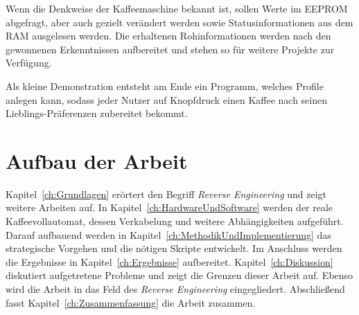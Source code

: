 Wenn die Denkweise der Kaffeemaschine bekannt ist, sollen Werte im \ac{EEPROM} abgefragt, aber auch gezielt verändert werden sowie Statusinformationen aus dem \ac{RAM} ausgelesen werden.
Die erhaltenen Rohinformationen werden nach den gewonnenen Erkenntnissen aufbereitet und stehen so für weitere Projekte zur Verfügung.

Als kleine Demonstration entsteht am Ende ein Programm, welches Profile anlegen kann, sodass jeder Nutzer auf Knopfdruck einen Kaffee nach seinen Lieblings-Präferenzen zubereitet bekommt.

\section{Aufbau der Arbeit}
Kapitel~\ref{ch:Grundlagen} erörtert den Begriff \textit{Reverse Engineering} und zeigt weitere Arbeiten auf.
In Kapitel~\ref{ch:HardwareUndSoftware} werden der reale Kaffeevollautomat, dessen Verkabelung und weitere Abhängigkeiten aufgeführt.
Darauf aufbauend werden in Kapitel~\ref{ch:MethodikUndImplementierung} das strategische Vorgehen und die nötigen Skripte entwickelt.
Im Anschluss werden die Ergebnisse in Kapitel~\ref{ch:Ergebnisse} aufbereitet.
Kapitel~\ref{ch:Diskussion} diskutiert aufgetretene Probleme und zeigt die Grenzen dieser Arbeit auf.
Ebenso wird die Arbeit in das Feld des \textit{Reverse Engineering} eingegliedert.
Abschließend fasst Kapitel~\ref{ch:Zusammenfassung} die Arbeit zusammen.
